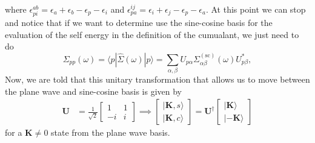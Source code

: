 where
$\epsilon_{pi}^{ab} = \epsilon_{a}+\epsilon_{b}-\epsilon_{p}-\epsilon_{i}$
and
$\epsilon_{pa}^{ij} = \epsilon_{i}+\epsilon_{j}-\epsilon_{p}-\epsilon_{a}$. At this point we can stop and notice that if we want to determine use the sine-cosine basis for the evaluation of the self energy in the definition of the cumualant, we just need to do
\begin{equation}
    \Sigma_{p p}(\omega)=\langle p| \hat{\Sigma}(\omega)|p\rangle=\sum_{\alpha, \beta} U_{p \alpha} \Sigma_{\alpha \beta}^{(\mathrm{sc})}(\omega) U_{p \beta}^*,
\end{equation}
Now, we are told that this unitary transformation that allows us to move between the plane wave and sine-cosine basis is given by
\begin{align}
\mathbf{U} &= \frac{1}{\sqrt{2}} \begin{bmatrix}
1 & 1 \\
 -i & i
\end{bmatrix}
\implies
\begin{bmatrix}|\mathbf{K},s \rangle \\
|\mathbf{K},c \rangle
\end{bmatrix} = \mathbf{U}^\dag \begin{bmatrix} |\mathbf{K} \rangle \\
|-\mathbf{K} \rangle
\end{bmatrix}
\end{align}
for a $\mathbf{K}\neq 0$ state from the plane wave basis.

